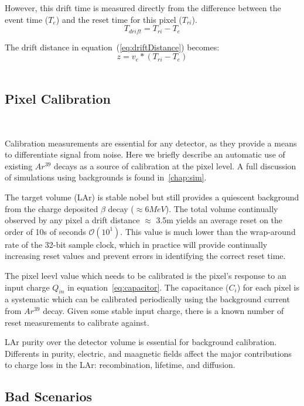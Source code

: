 However, this drift time is measured directly from the difference between the event time ($T_{e}$) and the reset time for this pixel ($T_{ri}$).
\begin{equation}
  T_{drift} = T_{ri} - T_{e}
\end{equation}

The drift distance in equation~(\ref{eq:driftDistance}) becomes:
\begin{equation}
  z = v_{e} * (T_{ri} - T_{e})
\end{equation}~\label{eq:driftDistanceCalc}

\subsection{Pixel Calibration}
~\label{sec:qpix_calib}

Calibration measurements are essential for any detector, as they provide a means to differentiate signal from noise.
Here we briefly describe an automatic use of existing $Ar^{39}$ decays as a source of calibration at the pixel level.
A full discussion of simulations using backgrounds is found in~\ref{chap:sim}.

The target volume (LAr) is stable nobel but still provides a quiescent background from the charge deposited $\beta$ decay ($\approx 6\unit{MeV}$).
The total volume continually observed by any pixel a drift distance $\approx$ 3.5\unit{m} yields an average reset on the order of 10s of seconds $\mathcal{O}(10^{1})$.
This value is much lower than the wrap-around rate of the 32-bit sample clock, which in practice will provide continually increasing reset values and prevent errors in identifying the correct reset time.

The pixel leevl value which needs to be calibrated is the pixel's response to an input charge $Q_{in}$ in equation~\ref{eq:capacitor}.
The capacitance ($C_{i}$) for each pixel is a systematic which can be calibrated periodically using the background current from $Ar^{39}$ decay.
Given some stable input charge, there is a known number of reset measurements to calibrate against.

LAr purity over the detector volume is essential for background calibration.
Differents in purity, electric, and maagnetic fields affect the major contributions to charge loss in the LAr: recombination, lifetime, and diffusion.

\subsection{Bad Scenarios}

